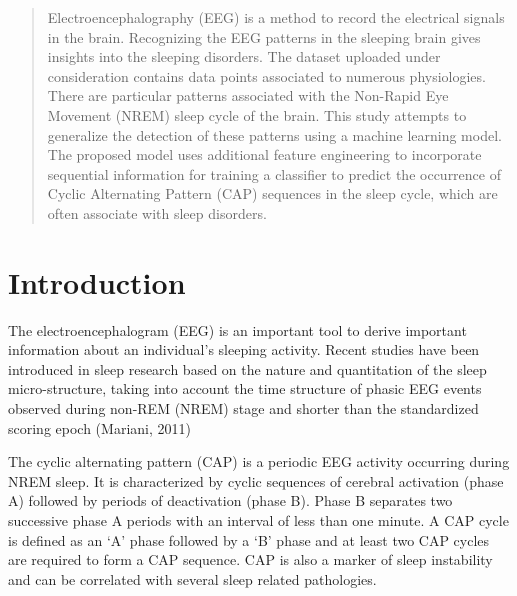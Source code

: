 \documentclass{article}
\begin{document}
\begin{abstract} 
Electroencephalography (EEG) is a method to record the electrical signals in the brain. Recognizing the EEG patterns in the sleeping brain gives insights into the sleeping disorders. The dataset uploaded under consideration contains data points associated to numerous physiologies. There are particular patterns associated with the Non-Rapid Eye Movement (NREM) sleep cycle of the brain. This study attempts to generalize the detection of these patterns using a machine learning model. The proposed model uses additional feature engineering to incorporate sequential information for training a classifier to predict the occurrence of Cyclic Alternating Pattern (CAP) sequences in the sleep cycle, which are often associate with sleep disorders. 
\end{abstract} 



\section{Introduction}
\label{Introduction}

The electroencephalogram (EEG) is an important tool to derive important information about an individual’s sleeping activity. Recent studies have been introduced in sleep research based on the nature and quantitation of the sleep micro-structure, taking into account the time structure of phasic EEG events observed during non-REM (NREM) stage and shorter than the standardized scoring epoch (Mariani, 2011)

	The cyclic alternating pattern (CAP) is a periodic EEG activity occurring during NREM sleep. It is characterized by cyclic sequences of cerebral activation (phase A) followed by periods of deactivation (phase B). Phase B separates two successive phase A periods with an interval of less than one minute. A CAP cycle is defined as an ‘A’ phase followed by a ‘B’ phase and at least two CAP cycles are required to form a CAP sequence. CAP is also a marker of sleep instability and can be correlated with several sleep related pathologies. 
\end{document}
